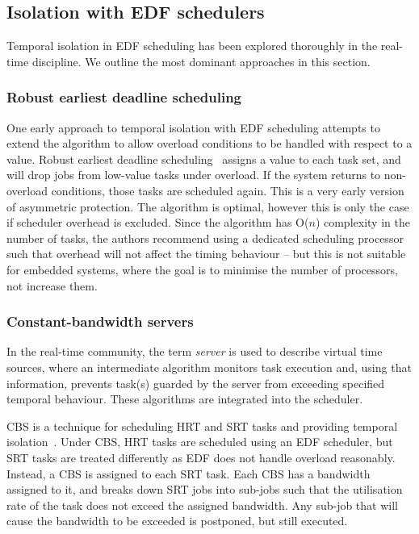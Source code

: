 \subsection{Isolation with EDF schedulers}

Temporal isolation in \gls{EDF} scheduling has been explored thoroughly in the real-time discipline.
We outline the most dominant approaches in this section.

\subsubsection{Robust earliest deadline scheduling}

One early approach to temporal isolation with \gls{EDF} scheduling attempts to extend the 
algorithm to allow overload conditions to be handled with respect to a value. Robust earliest deadline
scheduling~\citep{Buttazzo_Stankovic_93} assigns a value to each task set, and will drop jobs from
low-value tasks under overload. If the system returns to non-overload conditions, those tasks are
scheduled again. This is a very early version of asymmetric protection.
The algorithm is optimal, however this is only the case if
scheduler overhead is excluded.  Since the algorithm has O($n$) complexity in the number of
tasks, the authors recommend using a dedicated scheduling processor such that overhead will not
affect the timing behaviour -- but this is not suitable for embedded systems, where the goal is to
minimise the number of processors, not increase them.

\subsubsection{Constant-bandwidth servers}

In the real-time community, the term \emph{server} is used to describe virtual time sources, where
an intermediate algorithm monitors task execution and, using that information, prevents task(s)
guarded by the server from exceeding specified temporal behaviour. These algorithms are integrated
into the scheduler.

\Gls{CBS} is a technique for scheduling \gls{HRT} and
\gls{SRT} tasks and providing temporal isolation~\citep{Abeni_Buttazzo_04}. Under \gls{CBS}, \gls{HRT} tasks are scheduled using an \gls{EDF}
scheduler, but \gls{SRT} tasks are treated differently as \gls{EDF} does not handle overload
reasonably.
Instead, a \gls{CBS} is assigned to each \gls{SRT} task.  Each \gls{CBS} has a bandwidth assigned to
it, and breaks down \gls{SRT} jobs into sub-jobs such that the utilisation rate of the task does not
exceed the assigned bandwidth.  Any sub-job that will cause the bandwidth to be exceeded is
postponed, but still executed.

